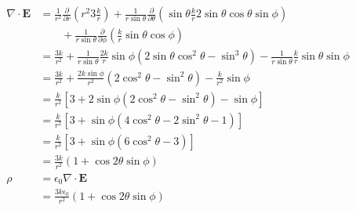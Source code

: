 \documentclass{article}
\renewcommand{\vec}[1]{\boldsymbol{\mathbf{#1}}}
\begin{document}
\begin{align*}
  \nabla \cdot \vec{E} & = \frac{1}{r^2} \frac{\partial}{\partial r} (r^2 3 \frac{k}{r}) + \frac{1}{r \sin \theta} \frac{\partial}{\partial \theta} \left( \sin \theta \frac{k}{r} 2 \sin \theta \cos \theta \sin \phi \right) \\
                       & \qquad + \frac{1}{r \sin \theta} \frac{\partial}{\partial \phi} \left( \frac{k}{r} \sin \theta \cos \phi \right)                                                                                      \\
                       & = \frac{3 k}{r^2} + \frac{1}{r \sin \theta} \frac{2 k}{r} \sin \phi (2 \sin \theta \cos^2 \theta - \sin^3 \theta) - \frac{1}{r \sin \theta} \frac{k}{r} \sin \theta \sin \phi                         \\
                       & = \frac{3 k}{r^2} + \frac{2 k \sin \phi}{r^2} (2 \cos^2 \theta - \sin^2 \theta) - \frac{k}{r^2} \sin \phi                                                                                             \\
                       & = \frac{k}{r^2} [3 + 2 \sin \phi (2 \cos^2 \theta - \sin^2 \theta) - \sin \phi]                                                                                                                       \\
                       & = \frac{k}{r^2} [3 + \sin \phi (4 \cos^2 \theta - 2 \sin^2 \theta - 1)]                                                                                                                               \\
                       & = \frac{k}{r^2} [3 + \sin \phi (6 \cos^2 \theta - 3)]                                                                                                                                                 \\
                       & = \frac{3 k}{r^2} (1 + \cos 2 \theta \sin \phi)                                                                                                                                                       \\
  \rho                 & = \epsilon_0 \nabla \cdot \vec{E}                                                                                                                                                                     \\
                       & = \frac{3 k \epsilon_0}{r^2} (1 + \cos 2 \theta \sin \phi)
\end{align*}
\end{document}
